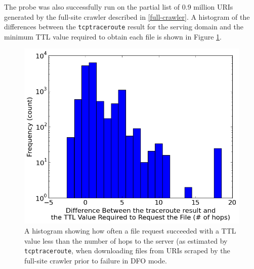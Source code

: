 The probe was also successfully run on the partial list of 0.9 million URIs generated by the full-site crawler described in \autoref{full-crawler}.
A histogram of the differences between the \texttt{tcptraceroute} result for the serving domain and the minimum TTL value required to obtain each file is shown in Figure \ref{fig_histfull}.
\begin{figure}
	\includegraphics[width=\columnwidth]{figures/histfull}
	\caption{
		A histogram showing how often a file request succeeded with a TTL value less than the number of hops to the server (as estimated by \texttt{tcptraceroute}, when downloading files from URIs scraped by the full-site crawler prior to failure in DFO mode.
	}
	\label{fig_histfull}
\end{figure}